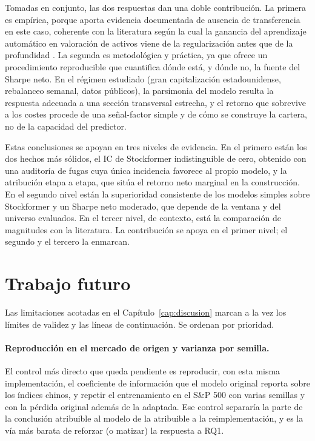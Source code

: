 Tomadas en conjunto, las dos respuestas dan una doble contribución. La primera es
empírica, porque aporta evidencia documentada de ausencia de transferencia en este caso,
coherente con la literatura según la cual la ganancia del aprendizaje automático en
valoración de activos viene de la regularización antes que de la profundidad
\autocite{gu2020empirical,rahimikia2025machine}. La segunda es metodológica y práctica, ya
que ofrece un procedimiento reproducible que cuantifica dónde está, y dónde no, la fuente
del Sharpe neto. En el régimen estudiado (gran capitalización estadounidense, rebalanceo semanal,
datos públicos), la parsimonia del modelo resulta la respuesta adecuada a una sección
transversal estrecha, y el retorno que sobrevive a los costes procede de una señal-factor
simple y de cómo se construye la cartera, no de la capacidad del predictor.

Estas conclusiones se apoyan en tres niveles de evidencia. En el primero están los dos
hechos más sólidos, el IC de Stockformer indistinguible de cero, obtenido con una
auditoría de fugas cuya única incidencia favorece al propio modelo, y la atribución etapa
a etapa, que sitúa el retorno neto marginal en la construcción. En el segundo nivel están
la superioridad consistente de los modelos simples sobre Stockformer y un Sharpe neto
moderado, que depende de la ventana y del universo evaluados. En el tercer nivel, de
contexto, está la comparación de magnitudes con la literatura. La contribución se apoya
en el primer nivel; el segundo y el tercero la enmarcan.

\section{Trabajo futuro}

Las limitaciones acotadas en el Capítulo~\ref{cap:discusion} marcan a la vez los límites
de validez y las líneas de continuación. Se ordenan por prioridad.

\paragraph{Reproducción en el mercado de origen y varianza por semilla.} El control más
directo que queda pendiente es reproducir, con esta misma implementación, el coeficiente
de información que el modelo original reporta sobre los índices chinos, y repetir el
entrenamiento en el S\&P 500 con varias semillas y con la pérdida original además de la
adaptada. Ese control separaría la parte de la conclusión atribuible al modelo de la
atribuible a la reimplementación, y es la vía más barata de reforzar (o matizar) la
respuesta a RQ1.

